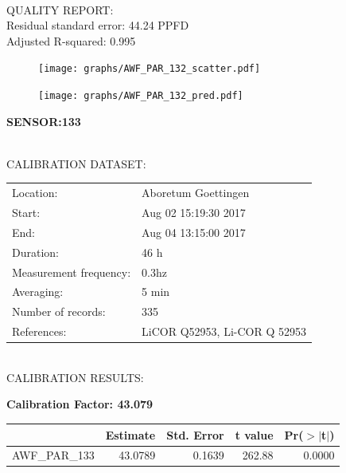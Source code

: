 \documentclass[oneside]{report}
\begin{document}
\hrulefill\\
QUALITY REPORT:\\
Residual standard error: 44.24 PPFD\\
Adjusted R-squared: 0.995



\begin{figure}[H]
  \centering
  \texttt{[image: graphs/AWF\_PAR\_132\_scatter.pdf]}
\end{figure}




\begin{figure}[H]
  \centering
  \texttt{[image: graphs/AWF\_PAR\_132\_pred.pdf]}
\end{figure}

\pagebreak


\begin{center}
\large{\textbf{SENSOR:133}}\\
\end{center}

\hrulefill\\
CALIBRATION DATASET:\\
\begin{table}[h!]
  \centering
  \label{tab:table1}
  \begin{tabular}{ll}
    Location: & Aboretum Goettingen\\ 
    
    
    Start:  & Aug 02 15:19:30 2017 \\
    End:   & Aug 04 13:15:00 2017\\ 
    Duration: & 46 h\\
    Measurement frequency: & 0.3hz\\
    Averaging:  &5 min\\
    Number of records: & 335 \\
    References: & LiCOR Q52953, Li-COR Q 52953 \\
  \end{tabular}
\end{table}

\hrulefill\\
CALIBRATION RESULTS:\\


\begin{center}
\textbf{\large{Calibration Factor: 43.079}}\\
\end{center}
\begin{table}[ht]
\centering
\begin{tabular}{rrrrr}
  \hline
 & Estimate & Std. Error & t value & Pr($>$$|$t$|$) \\ 
  \hline
AWF\_PAR\_133 & 43.0789 & 0.1639 & 262.88 & 0.0000 \\ 
   \hline
\end{tabular}
\end{table}
\end{document}
